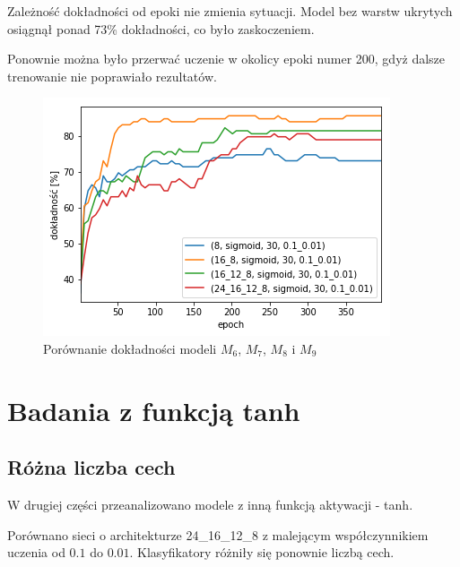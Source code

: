     Zależność dokładności od epoki nie zmienia sytuacji.
    Model bez warstw ukrytych osiągnął ponad 73\% dokładności, co było zaskoczeniem.

    Ponownie można było przerwać uczenie w okolicy epoki numer 200, gdyż dalsze trenowanie nie poprawiało rezultatów.

    \begin{figure}[htp]
        \centering
        \includegraphics[scale=0.8]{./img/arch-accuracy.png}
        \caption{Porównanie dokładności modeli $M_6$, $M_7$, $M_8$ i $M_9$}
    \end{figure}

    \section{Badania z funkcją tanh}\label{sec:badaniaZFunkcjąTanh}

    \subsection{Różna liczba cech}\label{subsec:różnaLiczbaCech2}

    W drugiej części przeanalizowano modele z inną funkcją aktywacji - tanh.

    Porównano sieci o architekturze 24\_16\_12\_8 z malejącym współczynnikiem uczenia od $0.1$ do $0.01$.
    Klasyfikatory różniły się ponownie liczbą cech.

